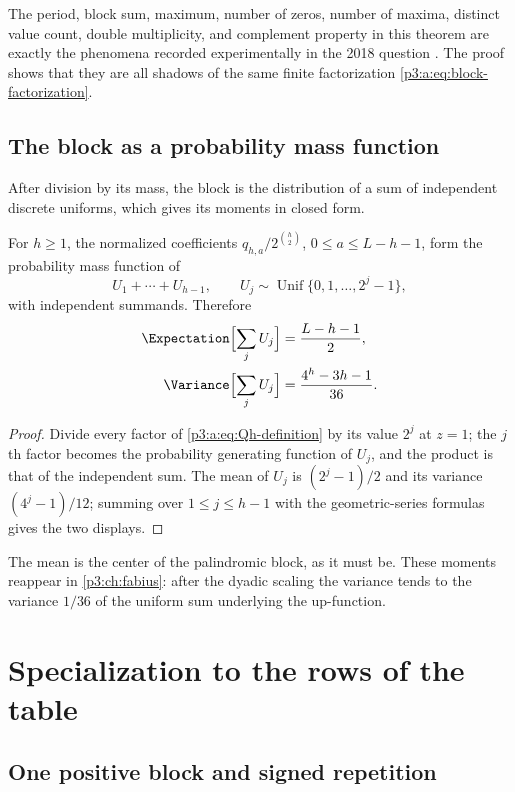 \documentclass[11pt,oneside]{article}
\numberwithin{equation}{section}
\theoremstyle{definition}
\theoremstyle{remark}
\begin{document}
The period, block sum, maximum, number of zeros, number of maxima, distinct
value count, double multiplicity, and complement property in this theorem are
exactly the phenomena recorded experimentally in the 2018 question
\cite{p3:reshetnikov-mse}.  The proof shows that they are all shadows of the same
finite factorization \eqref{p3:a:eq:block-factorization}.

\subsection{The block as a probability mass function}
After division by its mass, the block is the distribution of a sum of
independent discrete uniforms, which gives its moments in closed form.

\begin{proposition}\label{p3:c:prop:pulse-moments}
For $h\ge1$, the normalized coefficients $q_{h,a}/2^{\binom h2}$,
$0\le a\le L-h-1$, form the probability mass function of
\[
 U_1+\cdots+U_{h-1},\qquad U_j\sim\operatorname{Unif}\{0,1,\ldots,2^j-1\},
\]
with independent summands. Therefore
\begin{align}
 \Expectation\Bigl[\sum_jU_j\Bigr]&=\frac{L-h-1}{2},\label{p3:c:eq:pulse-mean}\\
 \Variance\Bigl[\sum_jU_j\Bigr]&=\frac{4^h-3h-1}{36}.\label{p3:c:eq:pulse-var}
\end{align}
\end{proposition}
\begin{proof}
Divide every factor of \eqref{p3:a:eq:Qh-definition} by its value $2^j$ at
$z=1$; the $j$th factor becomes the probability generating function of
$U_j$, and the product is that of the independent sum. The mean of $U_j$ is
$(2^j-1)/2$ and its variance $(4^j-1)/12$; summing over $1\le j\le h-1$
with the geometric-series formulas gives the two displays.
\end{proof}
The mean is the center of the palindromic block, as it must be. These
moments reappear in \cref{p3:ch:fabius}: after the dyadic scaling the variance
tends to the variance $1/36$ of the uniform sum underlying the up-function.

\section{Specialization to the rows of the table}\label{p3:ch:rows}

\subsection{One positive block and signed repetition}
\end{document}
